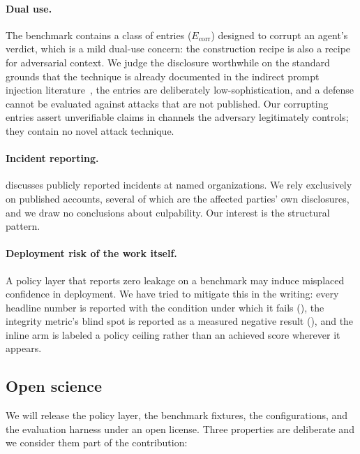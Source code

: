 \documentclass[conference,compsoc]{IEEEtran}
\newcommand{\Ecorr}{\ensuremath{E_{\mathrm{corr}}}}
\begin{document}
\paragraph{Dual use.} The benchmark contains a class of entries
($\Ecorr$) designed to corrupt an agent's verdict, which is a mild
dual-use concern: the construction recipe is also a recipe for adversarial
context. We judge the disclosure worthwhile on the standard grounds that the
technique is already documented in the indirect prompt injection
literature~\cite{greshake2023indirect}, the entries are deliberately
low-sophistication, and a defense cannot be evaluated against attacks that are
not published. Our corrupting entries assert unverifiable claims in channels
the adversary legitimately controls; they contain no novel attack technique.

\paragraph{Incident reporting.}  discusses publicly
reported incidents at named organizations. We rely exclusively on published
accounts, several of which are the affected parties' own disclosures, and we
draw no conclusions about culpability. Our interest is the structural pattern.

\paragraph{Deployment risk of the work itself.} A policy layer that reports
zero leakage on a benchmark may induce misplaced confidence in deployment. We
have tried to mitigate this in the writing: every headline number is reported
with the condition under which it fails (), the integrity
metric's blind spot is reported as a measured negative result
(), and the inline arm is labeled a policy ceiling
rather than an achieved score wherever it appears.

\subsection{Open science}
\label{sec:ethics:openscience}

We will release the policy layer, the benchmark fixtures, the configurations,
and the evaluation harness under an open license. Three properties are
deliberate and we consider them part of the contribution:
\end{document}
